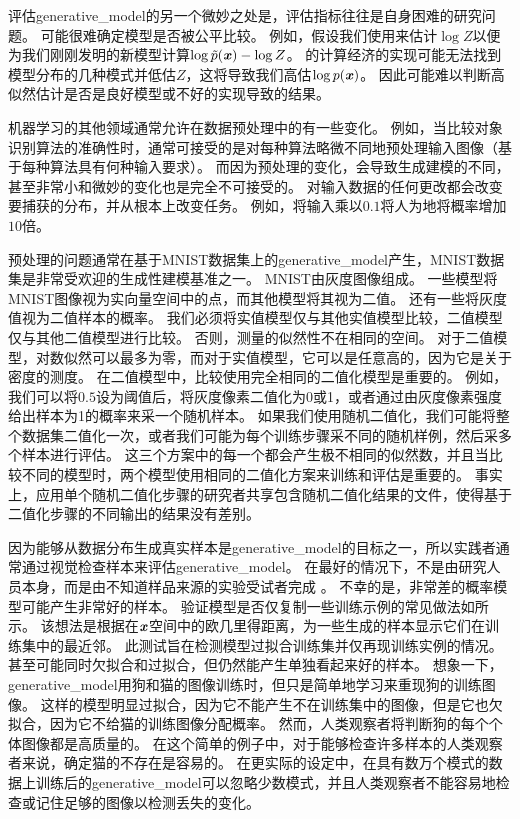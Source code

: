 评估\gls{generative_model}的另一个微妙之处是，评估指标往往是自身困难的研究问题。 
可能很难确定模型是否被公平比较。
例如，假设我们使用来估计$\log Z$以便为我们刚刚发明的新模型计算$\log \tilde{p}(\boldsymbol{\mathit{x}}) - \log Z$。
的计算经济的实现可能无法找到模型分布的几种模式并低估$Z$，这将导致我们高估$\log p(\boldsymbol{\mathit{x}})$。
因此可能难以判断高似然估计是否是良好模型或不好的实现导致的结果。
 
机器学习的其他领域通常允许在数据预处理中的有一些变化。
例如，当比较对象识别算法的准确性时，通常可接受的是对每种算法略微不同地预处理输入图像（基于每种算法具有何种输入要求）。
而因为预处理的变化，会导致生成建模的不同，甚至非常小和微妙的变化也是完全不可接受的。
对输入数据的任何更改都会改变要捕获的分布，并从根本上改变任务。
例如，将输入乘以$0.1$将人为地将概率增加$10$倍。


预处理的问题通常在基于MNIST数据集上的\gls{generative_model}产生，MNIST数据集是非常受欢迎的生成性建模基准之一。
MNIST由灰度图像组成。
一些模型将MNIST图像视为实向量空间中的点，而其他模型将其视为二值。
还有一些将灰度值视为二值样本的概率。
我们必须将实值模型仅与其他实值模型比较，二值模型仅与其他二值模型进行比较。
否则，测量的似然性不在相同的空间。
对于二值模型，对数似然可以最多为零，而对于实值模型，它可以是任意高的，因为它是关于密度的测度。
在二值模型中，比较使用完全相同的二值化模型是重要的。
例如，我们可以将$0.5$设为阈值后，将灰度像素二值化为0或1，或者通过由灰度像素强度给出样本为1的概率来采一个随机样本。
如果我们使用随机二值化，我们可能将整个数据集二值化一次，或者我们可能为每个训练步骤采不同的随机样例，然后采多个样本进行评估。
这三个方案中的每一个都会产生极不相同的似然数，并且当比较不同的模型时，两个模型使用相同的二值化方案来训练和评估是重要的。
事实上，应用单个随机二值化步骤的研究者共享包含随机二值化结果的文件，使得基于二值化步骤的不同输出的结果没有差别。

因为能够从数据分布生成真实样本是\gls{generative_model}的目标之一，所以实践者通常通过视觉检查样本来评估\gls{generative_model}。
在最好的情况下，不是由研究人员本身，而是由不知道样品来源的实验受试者完成 \citep{denton2015deep}。
不幸的是，非常差的概率模型可能产生非常好的样本。
验证模型是否仅复制一些训练示例的常见做法如所示。
该想法是根据在$\boldsymbol{\mathit{x}}$空间中的欧几里得距离，为一些生成的样本显示它们在训练集中的最近邻。
此测试旨在检测模型过拟合训练集并仅再现训练实例的情况。
甚至可能同时欠拟合和过拟合，但仍然能产生单独看起来好的样本。
想象一下，\gls{generative_model}用狗和猫的图像训练时，但只是简单地学习来重现狗的训练图像。
这样的模型明显过拟合，因为它不能产生不在训练集中的图像，但是它也欠拟合，因为它不给猫的训练图像分配概率。
然而，人类观察者将判断狗的每个个体图像都是高质量的。
在这个简单的例子中，对于能够检查许多样本的人类观察者来说，确定猫的不存在是容易的。
在更实际的设定中，在具有数万个模式的数据上训练后的\gls{generative_model}可以忽略少数模式，并且人类观察者不能容易地检查或记住足够的图像以检测丢失的变化。

